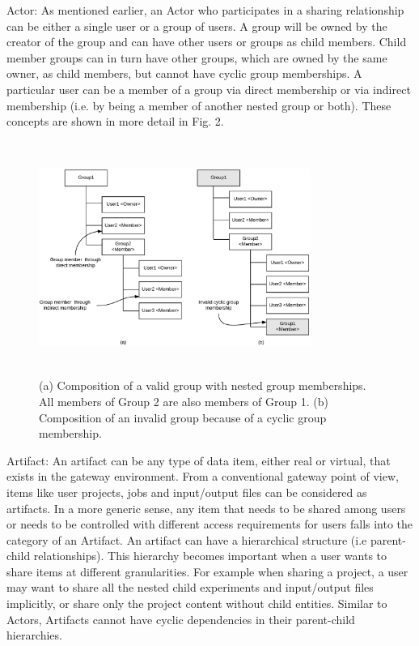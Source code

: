 \documentclass[sigconf]{acmart}
\begin{document}
Actor: As mentioned earlier, an Actor who participates in a sharing relationship can be either a single user or a group of users. A group will be owned by the creator of the group and can have other users or groups as child members. Child member groups can in turn have other groups, which are owned by the same owner, as child members, but cannot have cyclic group memberships. A particular user can be a member of a group via direct membership or via indirect membership (i.e. by being a member of another nested group or both). These concepts are shown in more detail in Fig. 2.

\begin{figure}
\includegraphics[height=3in, width=3.5in]{figures/group-composition.pdf}
\caption{(a) Composition of a valid group with nested group memberships. All members of Group 2 are also members of Group 1. (b) Composition of an invalid group because of a cyclic group membership.}
\end{figure}

Artifact: An artifact can be any type of data item, either real or virtual, that exists in the gateway environment.	From a conventional gateway point of view, items like user projects, jobs and input/output files can be considered as artifacts. In a more generic sense, any item that needs to be shared among users or needs to be controlled with different access requirements for users falls into the category of an Artifact. An artifact can have a hierarchical structure (i.e parent-child relationships). This hierarchy becomes important when a user wants to share items at different granularities. For example when sharing a project, a user may want to share all the nested child experiments and input/output files implicitly, or share only the project content without child entities. Similar to Actors, Artifacts cannot have cyclic dependencies in their parent-child hierarchies.
\end{document}
